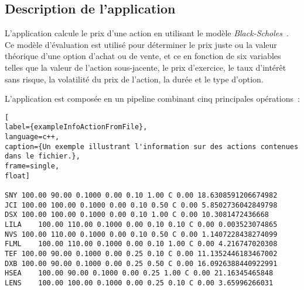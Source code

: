 \subsection{Description de l'application}

L'application  calcule le prix d'une action en utilisant le modèle \emph{Black-Scholes}~\citep{macbeth1979empirical}. Ce mod\`ele d'\'evaluation est utilis\'e pour d\'eterminer le prix juste ou la valeur th\'eorique d'une option d'achat ou de vente, et ce en fonction de six variables telles que la valeur de l'action sous-jacente, le prix d'exercice, le taux d'int\'er\^et sans risque, la volatilit\'e du prix de l'action, la dur\'ee et le type d'option. 

L'application  est compos\'ee en un pipeline combinant cinq principales op\'erations~: 

\begin{lstlisting}[
label={exampleInfoActionFromFile},
language=c++,
caption={Un exemple illustrant l'information sur des actions contenues dans le fichier.},
frame=single,
float]

SNY	100.00 90.00 0.1000 0.00 0.10 1.00 C 0.00 18.6308591206674982
JCI	100.00 100.00 0.1000 0.00 0.10 0.50 C 0.00 5.8502736042849798
DSX	100.00 100.00 0.1000 0.00 0.10 1.00 C 0.00 10.3081472436668
LILA	100.00 110.00 0.1000 0.00 0.10 0.10 C 0.00 0.003523074865
NVS	100.00 110.00 0.1000 0.00 0.10 0.50 C 0.00 1.1407228438274099
FLML	100.00 110.00 0.1000 0.00 0.10 1.00 C 0.00 4.216747020308
TEF	100.00 90.00 0.1000 0.00 0.25 0.10 C 0.00 11.1352446183467002
DXB	100.00 90.00 0.1000 0.00 0.25 0.50 C 0.00 16.0926388440922991
HSEA	100.00 90.00 0.1000 0.00 0.25 1.00 C 0.00 21.16345465848
LENS	100.00 100.00 0.1000 0.00 0.25 0.10 C 0.00 3.65996266031
\end{lstlisting}

